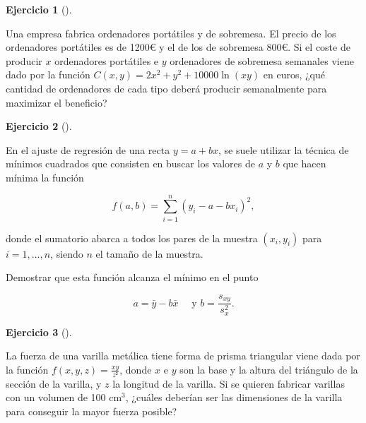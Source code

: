 \documentclass[
  a4paper,
]{scrreport}
\theoremstyle{definition}
\newtheorem{exercise}{Ejercicio}[chapter]
\theoremstyle{remark}
\begin{document}
\begin{exercise}[]\protect\hypertarget{exr-maximizacion-beneficio}{}\label{exr-maximizacion-beneficio}

Una empresa fabrica ordenadores portátiles y de sobremesa. El precio de
los ordenadores portátiles es de 1200€ y el de los de sobremesa 800€. Si
el coste de producir \(x\) ordenadores portátiles e \(y\) ordenadores de
sobremesa semanales viene dado por la función
\(C(x,y)=2x^2+y^2+10000\ln(xy)\) en euros, ¿qué cantidad de ordenadores
de cada tipo deberá producir semanalmente para maximizar el beneficio?

\end{exercise}

\begin{exercise}[]\protect\hypertarget{exr-ajuste-minimos-cuadrados}{}\label{exr-ajuste-minimos-cuadrados}

En el ajuste de regresión de una recta \(y=a+bx\), se suele utilizar la
técnica de mínimos cuadrados que consisten en buscar los valores de
\(a\) y \(b\) que hacen mínima la función

\[
f(a,b)= \sum_{i=1}^{n}(y_i-a-bx_i)^2,
\]

donde el sumatorio abarca a todos los pares de la muestra \((x_i,y_i)\)
para \(i=1,\ldots, n\), siendo \(n\) el tamaño de la muestra.

Demostrar que esta función alcanza el mínimo en el punto

\[
a=\bar y-b\bar x \quad \mbox{ y } b=\frac{s_{xy}}{s_x^2}.
\]

\end{exercise}

\begin{exercise}[]\protect\hypertarget{exr-maximizacion-fuerza-prisma-triangular}{}\label{exr-maximizacion-fuerza-prisma-triangular}

La fuerza de una varilla metálica tiene forma de prisma triangular viene
dada por la función \(f(x,y,z) = \frac{xy}{z²}\), donde \(x\) e \(y\)
son la base y la altura del triángulo de la sección de la varilla, y
\(z\) la longitud de la varilla. Si se quieren fabricar varillas con un
volumen de 100 cm\(^3\), ¿cuáles deberían ser las dimensiones de la
varilla para conseguir la mayor fuerza posible?

\end{exercise}
\end{document}
